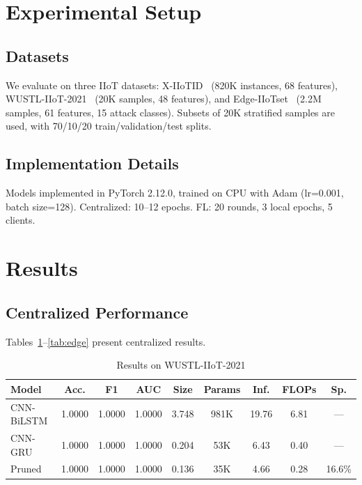 \documentclass[12pt,a4paper]{article}
\begin{document}
\section{Experimental Setup}

\subsection{Datasets}

We evaluate on three IIoT datasets: X-IIoTID~\cite{alhawawreh2021xiitoid} (820K instances, 68 features), WUSTL-IIoT-2021~\cite{zolanvari2021wustl} (20K samples, 48 features), and Edge-IIoTset~\cite{ferrag2022edgeiiotset} (2.2M samples, 61 features, 15 attack classes). Subsets of 20K stratified samples are used, with 70/10/20 train/validation/test splits.

\subsection{Implementation Details}

Models implemented in PyTorch 2.12.0, trained on CPU with Adam (lr=0.001, batch size=128). Centralized: 10--12 epochs. FL: 20 rounds, 3 local epochs, 5 clients.

\section{Results}

\subsection{Centralized Performance}

Tables~\ref{tab:wustl}--\ref{tab:edge} present centralized results.

\begin{table}[hbt]
\centering
\caption{Results on WUSTL-IIoT-2021}
\label{tab:wustl}
\begin{tabular}{lcccccccc}
\toprule
Model & Acc. & F1 & AUC & Size & Params & Inf. & FLOPs & Sp. \\
\midrule
CNN-BiLSTM & 1.0000 & 1.0000 & 1.0000 & 3.748 & 981K & 19.76 & 6.81 & --- \\
CNN-GRU & 1.0000 & 1.0000 & 1.0000 & 0.204 & 53K & 6.43 & 0.40 & --- \\
Pruned & 1.0000 & 1.0000 & 1.0000 & 0.136 & 35K & 4.66 & 0.28 & 16.6\% \\
\bottomrule
\end{tabular}
\end{table}
\end{document}
